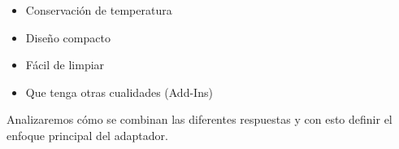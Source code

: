 
\begin{itemize}
    \item Conservación de temperatura 
    \item Diseño compacto
    \item Fácil de limpiar
    \item Que tenga otras cualidades (Add-Ins)
\end{itemize}

Analizaremos cómo se combinan las diferentes respuestas y con esto definir el enfoque principal del adaptador.
